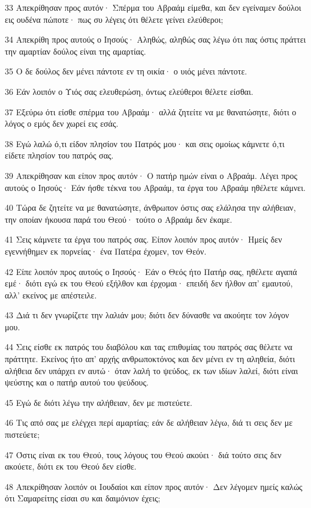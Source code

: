 \par 33 Απεκρίθησαν προς αυτόν· Σπέρμα του Αβραάμ είμεθα, και δεν εγείναμεν δούλοι εις ουδένα πώποτε· πως συ λέγεις ότι θέλετε γείνει ελεύθεροι;
\par 34 Απεκρίθη προς αυτούς ο Ιησούς· Αληθώς, αληθώς σας λέγω ότι πας όστις πράττει την αμαρτίαν δούλος είναι της αμαρτίας.
\par 35 Ο δε δούλος δεν μένει πάντοτε εν τη οικία· ο υιός μένει πάντοτε.
\par 36 Εάν λοιπόν ο Υιός σας ελευθερώση, όντως ελεύθεροι θέλετε είσθαι.
\par 37 Εξεύρω ότι είσθε σπέρμα του Αβραάμ· αλλά ζητείτε να με θανατώσητε, διότι ο λόγος ο εμός δεν χωρεί εις εσάς.
\par 38 Εγώ λαλώ ό,τι είδον πλησίον του Πατρός μου· και σεις ομοίως κάμνετε ό,τι είδετε πλησίον του πατρός σας.
\par 39 Απεκρίθησαν και είπον προς αυτόν· Ο πατήρ ημών είναι ο Αβραάμ. Λέγει προς αυτούς ο Ιησούς· Εάν ήσθε τέκνα του Αβραάμ, τα έργα του Αβραάμ ηθέλετε κάμνει.
\par 40 Τώρα δε ζητείτε να με θανατώσητε, άνθρωπον όστις σας ελάλησα την αλήθειαν, την οποίαν ήκουσα παρά του Θεού· τούτο ο Αβραάμ δεν έκαμε.
\par 41 Σεις κάμνετε τα έργα του πατρός σας. Είπον λοιπόν προς αυτόν· Ημείς δεν εγεννήθημεν εκ πορνείας· ένα Πατέρα έχομεν, τον Θεόν.
\par 42 Είπε λοιπόν προς αυτούς ο Ιησούς· Εάν ο Θεός ήτο Πατήρ σας, ηθέλετε αγαπά εμέ· διότι εγώ εκ του Θεού εξήλθον και έρχομαι· επειδή δεν ήλθον απ' εμαυτού, αλλ' εκείνος με απέστειλε.
\par 43 Διά τι δεν γνωρίζετε την λαλιάν μου; διότι δεν δύνασθε να ακούητε τον λόγον μου.
\par 44 Σεις είσθε εκ πατρός του διαβόλου και τας επιθυμίας του πατρός σας θέλετε να πράττητε. Εκείνος ήτο απ' αρχής ανθρωποκτόνος και δεν μένει εν τη αληθεία, διότι αλήθεια δεν υπάρχει εν αυτώ· όταν λαλή το ψεύδος, εκ των ιδίων λαλεί, διότι είναι ψεύστης και ο πατήρ αυτού του ψεύδους.
\par 45 Εγώ δε διότι λέγω την αλήθειαν, δεν με πιστεύετε.
\par 46 Τις από σας με ελέγχει περί αμαρτίας; εάν δε αλήθειαν λέγω, διά τι σεις δεν με πιστεύετε;
\par 47 Όστις είναι εκ του Θεού, τους λόγους του Θεού ακούει· διά τούτο σεις δεν ακούετε, διότι εκ του Θεού δεν είσθε.
\par 48 Απεκρίθησαν λοιπόν οι Ιουδαίοι και είπον προς αυτόν· Δεν λέγομεν ημείς καλώς ότι Σαμαρείτης είσαι συ και δαιμόνιον έχεις;
